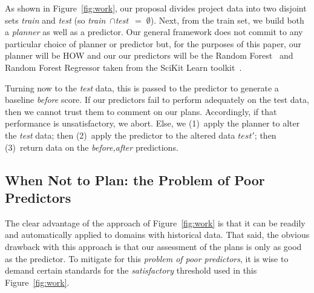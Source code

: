 \documentclass[conference]{IEEEtran}
\newcommand{\fig}[1]{Figure~\ref{fig:#1}}
\begin{document}
As shown in \fig{work}, our proposal divides
project data  into two disjoint sets {\em train} and {\em test}
(so \mbox{{\em train} $\cap ${\em test} $=\;\emptyset$}).
Next, from the train set, we build both a {\em planner} as well
as a {  predictor}. Our general framework does not   commit to any particular  choice
of { planner} or { predictor} but, for the purposes of this paper, 
our { planner}
will be HOW  and our
our { predictors} will be the Random Forest~\cite{Breiman2001} and Random Forest
Regressor taken from the SciKit
Learn toolkit~\cite{Pedregosa2012}.  
%
%


Turning now to the {\em test} data, this is passed to the { predictor}
to generate a baseline {\em before}  score.
If our { predictors} fail to perform adequately on the test data,
then we cannot trust them to comment on our plans. Accordingly,
if that performance is unsatisfactory, we abort.
Else, we (1)~apply the { planner} to alter the {\em test} data;
then (2)~apply the { predictor} to the altered data $test'$;
then (3)~return data on the {\em before,after} predictions.



\subsection{When Not to Plan: the Problem of Poor Predictors}\label{sec:notplan}

The clear advantage of the approach of \fig{work} is that it can be readily and automatically
applied to domains with historical data. That said, the obvious drawback with this approach
is that our assessment of the plans is only as good as the predictor. To 
mitigate for this {\em problem of poor predictors}, it is wise to demand certain standards for the {\em
satisfactory} threshold used in this \fig{work}. 
 
\end{document}
